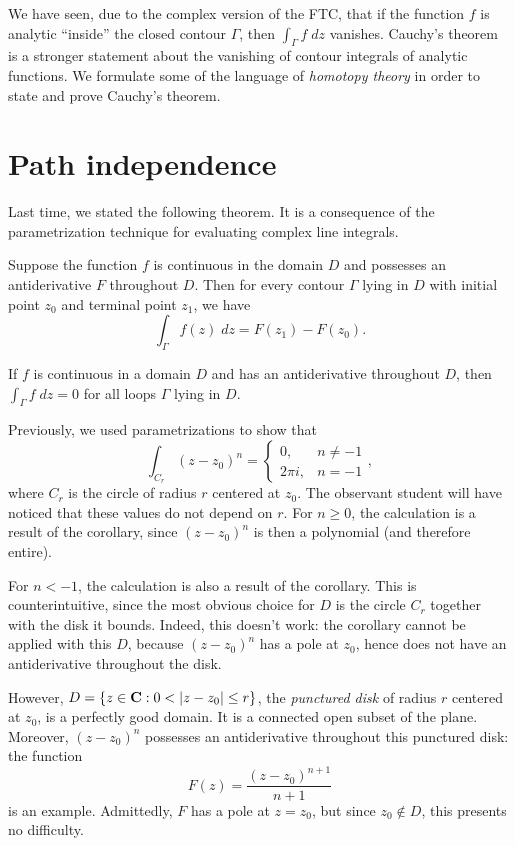 \documentclass[twocolumn,12pt]{article}
\date{April 24, 2013 (Wed)}
\begin{document}
\makeheader

\begin{summary}
We have seen, due to the complex version of the FTC, that if the function $f$ is analytic ``inside'' the closed contour $\Gamma$, then $\int_{\Gamma} f \; dz$ vanishes. Cauchy's theorem is a stronger statement about the vanishing of contour integrals of analytic functions. We formulate some of the language of \emph{homotopy theory} in order to state and prove Cauchy's theorem.
\end{summary}

\section{Path independence}
Last time, we stated the following theorem. It is a consequence of the parametrization technique for evaluating complex line integrals.
\begin{Theorem}
 Suppose the function $f$ is continuous in the domain $D$ and possesses an antiderivative $F$ throughout $D$. Then for every contour $\Gamma$ lying in $D$ with initial point $z_0$ and terminal point $z_1$, we have
 \[
 \int_{\Gamma} f(z) \; dz = F(z_1) - F(z_0).
 \]
\end{Theorem} 
\begin{corollary}
    If $f$ is continuous in a domain $D$ and has an antiderivative throughout $D$, then $\int_{\Gamma} f \; dz = 0$ for all loops $\Gamma$ lying in $D$.
\end{corollary}
Previously, we used parametrizations to show that 
\[
    \int_{C_r} (z - z_0)^n = \begin{cases}
        0, & n \ne -1 \\
        2\pi i, & n = -1
    \end{cases},
\]
where $C_r$ is the circle of radius $r$ centered at $z_0$. The observant student will have noticed that these values do not depend on $r$. For $n \geq 0$, the calculation is a result of the corollary, since $(z - z_0)^n$ is then a polynomial (and therefore entire).

For $n < -1$, the calculation is also a result of the corollary. This is counterintuitive, since the most obvious choice for $D$ is the circle $C_r$ together with the disk it bounds. Indeed, this doesn't work: the corollary cannot be applied with this $D$, because $(z - z_0)^n$ has a pole at $z_0$, hence does not have an antiderivative throughout the disk. 

However, $D = \{ z \in \mathbf{C} : 0 < |z - z_0| \leq r \}$, the \emph{punctured disk} of radius $r$ centered at $z_0$, is a perfectly good domain. It is a connected open subset of the plane. Moreover, $(z-z_0)^n$ possesses an antiderivative throughout this punctured disk: the function 
\[
    F(z) = \frac{(z - z_0)^{n+1}}{n+1}
\]
is an example. Admittedly, $F$ has a pole at $z = z_0$, but since $z_0 \not\in D$, this presents no difficulty.
\end{document}
